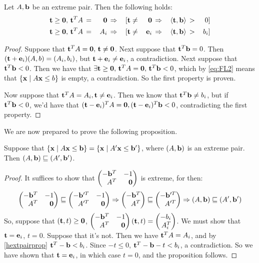 \begin{Prop}{\label{prop:hextpair}
		Let $A,\mathbf{b}$ be an extreme pair.  Then the following holds:
		\begin{alignat}{6}
			\mathbf{t}\geq\mathbf{0},\,\mathbf{t}^T A \,                      & =           & \, \mathbf{0}  \,         & \Rightarrow & \, [\mathbf{t}   & \neq & \, \mathbf{0} \,
			                                          & \Rightarrow & \, \left\langle \mathbf{t}, \mathbf{b} \right\rangle \, & >           & \, 0 ]                       \\
			\label{hextpairprop} \mathbf{t}\geq\mathbf{0},\,\mathbf{t}^T A \, & =           & \, A_i \,         & \Rightarrow & \, [\mathbf{t}   & \neq & \, \mathbf{e}_i \,
			                                          & \Rightarrow & \, \left\langle \mathbf{t}, \mathbf{b} \right\rangle \, & >           & \, b_i ]
		\end{alignat}
	}\end{Prop}
\begin{proof}
	Suppose that $\mathbf{t}^T A = \mathbf{0},\, \mathbf{t}\neq\mathbf{0}$.  Next suppose that $\mathbf{t}^T\mathbf{b} = 0$.  Then $(\mathbf{t} + \mathbf{e}_i)(A,b) = (A_i,b_i)$, but $\mathbf{t}+\mathbf{e}_i \neq \mathbf{e}_i$, a contradiction.  Next suppose that ${\mathbf{t}^T\mathbf{b} < 0}$.  Then we have that $\exists \mathbf{t}\geq\mathbf{0},\,\mathbf{t}^T A = \mathbf{0},\,\mathbf{t}^T \mathbf{b} < 0$, which by \eqref{eq:FL2} means that $\left\{\mathbf{x}\;|\; A\mathbf{x}\leq b\right\}$ is empty, a contradiction.  So the first property is proven.

	Now suppose that $\mathbf{t}^T A = A_i, \mathbf{t}\neq\mathbf{e}_i$.  Then we know that $\mathbf{t}^T \mathbf{b} \neq b_i$, but if $\mathbf{t}^T\mathbf{b} < 0$, we'd have that $(\mathbf{t} - \mathbf{e}_i)^T A = \mathbf{0}, (\mathbf{t}-\mathbf{e}_i)^T\mathbf{b} < 0$, contradicting the first property.
\end{proof}

We are now prepared to prove the following proposition.

\begin{Prop}{\label{prop:ddhext}
		Suppose that $\left\{\mathbf{x}\;|\; A\mathbf{x}\leq \mathbf{b}\right\} = \left\{\mathbf{x}\;|\; A'\mathbf{x}\leq \mathbf{b}'\right\}$, where $(A,\mathbf{b})$ is an extreme pair.  Then $(A,\mathbf{b}) \sqsubseteq (A',\mathbf{b}')$.
	}\end{Prop}

\begin{proof}
	It suffices to show that $\pmb -\b^T & -1 \\ A^T & \0 \pme$ is extreme, for then:
	\[\pmb -\b^T & -1 \\ A^T & \0 \pme \sqsubseteq \pmb -\b'^T & -1 \\ A'^T & \0 \pme \Rightarrow
		\pmb -\b^T \\ A^T \pme \sqsubseteq \pmb -\b'^T \\ A'^T \pme \Rightarrow
		(A,\b) \sqsubseteq (A',\b')
	\]
	So, suppose that $(\mathbf{t},t) \geq \mathbf{0}$, $\pmb -\b^T & -1 \\ A^T & \0 \pme(\t,t) = \pmb -b_i \\ A^T_i\pme$.  We must show that $\mathbf{t} = \mathbf{e}_i$, $t = 0$.  Suppose that it's not.  Then we have $\mathbf{t}^T A = A_i$, and by \eqref{hextpairprop} $\mathbf{t}^T-\mathbf{b} < b_i$.  Since $-t \leq 0$, $\mathbf{t}^T-\mathbf{b} - t < b_i$, a contradiction.  So we have shown that $\mathbf{t} = \mathbf{e}_i$, in which case $t = 0$, and the proposition follows.
\end{proof}

